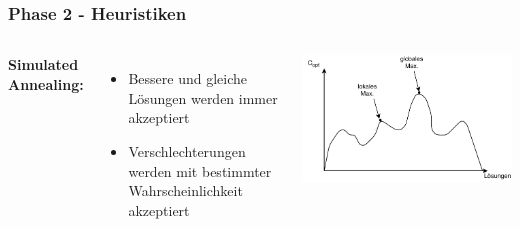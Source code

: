 \documentclass[aspectratio=169]{beamer}
\begin{document}
\begin{frame}
	\frametitle{Phase 2 - Heuristiken}
	\begin{columns}[c] %
		
		\textbf{Simulated Annealing:}
		\begin{itemize}
			\item Bessere und gleiche Lösungen werden immer akzeptiert
			\item Verschlechterungen werden mit bestimmter Wahrscheinlichkeit akzeptiert
		\end{itemize}
		\includegraphics[scale=.6]{sa_maximum.pdf}
		
		
		
	\end{columns}
	\end{frame}
	
\end{document}
